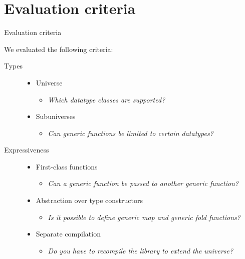 \documentclass[10pt]{beamer}
\begin{document}
\section{Evaluation criteria}
\begin{frame}{Evaluation criteria}

We evaluated the following criteria:
\begin{description}
\item[Types]
\begin{itemize}
\item Universe
\begin{itemize}
\item \textit{Which datatype classes are supported?}
\end{itemize}
\item Subuniverses
\begin{itemize}
\item \textit{Can generic functions be limited to certain datatypes?}
\end{itemize}
\end{itemize}
\end{description}

\begin{description}
\item[Expressiveness]
\begin{itemize}
\item First-class functions
\begin{itemize}
\item \textit{Can a generic function be passed to another generic function?}
\end{itemize}
\item Abstraction over type constructors 
\begin{itemize}
\item \textit{Is it possible to define generic map and generic fold functions?}
\end{itemize}
\item Separate compilation
\begin{itemize}
\item \textit{Do you have to recompile the library to extend the universe?}
\end{itemize}
\end{itemize}
\end{description}

\end{frame}
\end{document}
